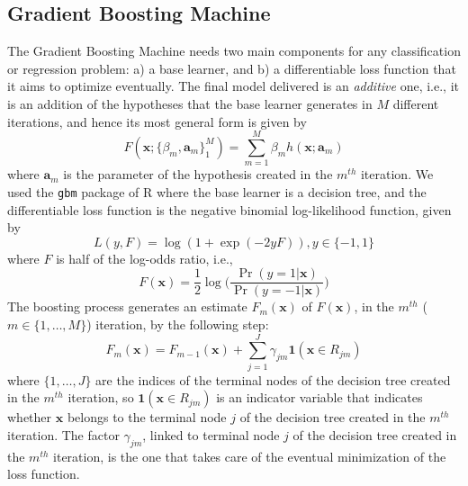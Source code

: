 \subsection{Gradient Boosting Machine}
\label{subsec:gbm}
The Gradient Boosting Machine \cite{Friedman01} needs two main components for any classification or regression problem: a) a base learner, and b) a differentiable loss function that it aims to optimize eventually. The final model delivered is an {\em additive} one, i.e., it is an addition of the hypotheses that the base learner generates in $M$ different iterations, and hence its most general form is given by 
\begin{equation}
\label{eqn:additive}
F(\mathbf{x};\{{\beta}_m, \mathbf{a}_m\}_1^M) = \sum_{m=1}^M{\beta}_mh(\mathbf{x};{\mathbf{a}}_m)
\end{equation}
where ${\mathbf{a}}_m$ is the parameter of the hypothesis created in the $m^{th}$ iteration. We used the \texttt{gbm} package of R \cite{gbm} where the base learner is a decision tree, and the differentiable loss function is the negative binomial log-likelihood function, given by 
\begin{equation}
\label{eqn:nbll}
L(y,F) = \log{(1 + \exp(-2yF))}, y \in \{-1,1\}
\end{equation}
where $F$ is half of the log-odds ratio, i.e., 
\begin{equation}
\label{eqn:hlo}
F(\mathbf{x}) = \frac{1}{2}\log{\Bigg(\frac{\Pr(y = 1|\mathbf{x})}{\Pr(y = -1|\mathbf{x})}\Bigg)}
\end{equation}
The boosting process generates an estimate $F_m(\mathbf{x})$ of $F(\mathbf{x})$, in the $m^{th}$ ($m \in \{1,\ldots,M\}$) iteration, by the following step:
\begin{equation}
\label{eqn:boosting_step}
F_m(\mathbf{x}) = F_{m-1}(\mathbf{x}) + \sum_{j=1}^J{\gamma}_{jm}\mathbf{1}(\mathbf{x} \in R_{jm})
\end{equation}
where $\{1,\ldots,J\}$ are the indices of the terminal nodes of the decision tree created in the $m^{th}$ iteration, so $\mathbf{1}(\mathbf{x} \in R_{jm})$ is an indicator variable that indicates whether $\mathbf{x}$ belongs to the terminal node $j$ of the decision tree created in the $m^{th}$ iteration. The factor ${\gamma}_{jm}$, linked to terminal node $j$ of the decision tree created in the $m^{th}$ iteration, is the one that takes care of the eventual minimization of the loss function. \\

